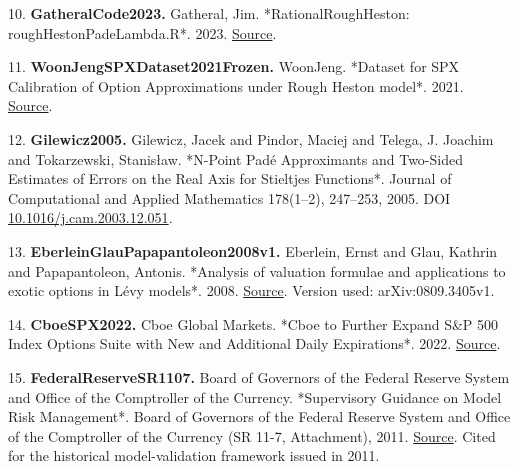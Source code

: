 \documentclass[a4paper,11pt]{article}
\begin{document}
10. \textbf{GatheralCode2023.} Gatheral, Jim. *RationalRoughHeston: roughHestonPadeLambda.R*. 2023. \href{https://github.com/jgatheral/RationalRoughHeston/blob/d65ea96e4c113fbb330074dfaea3e7715d650bbd/roughHestonPadeLambda.R}{Source}.

11. \textbf{WoonJengSPXDataset2021Frozen.} WoonJeng. *Dataset for SPX Calibration of Option Approximations under Rough Heston model*. 2021. \href{https://github.com/WoonJeng/Dataset-for-SPX-Calibration-of-Option-Approximations-under-Rough-Heston-model/tree/860049da2b7486fe8aa509061eff23cc28c2ef89}{Source}.

12. \textbf{Gilewicz2005.} Gilewicz, Jacek and Pindor, Maciej and Telega, J. Joachim and Tokarzewski, Stanisław. *N-Point Padé Approximants and Two-Sided Estimates of Errors on the Real Axis for Stieltjes Functions*. Journal of Computational and Applied Mathematics 178(1–2), 247–253, 2005. DOI \href{https://doi.org/10.1016/j.cam.2003.12.051}{10.1016/j.cam.2003.12.051}.

13. \textbf{EberleinGlauPapapantoleon2008v1.} Eberlein, Ernst and Glau, Kathrin and Papapantoleon, Antonis. *Analysis of valuation formulae and applications to exotic options in Lévy models*. 2008. \href{https://arxiv.org/abs/0809.3405v1}{Source}. Version used: arXiv:0809.3405v1.

14. \textbf{CboeSPX2022.} Cboe Global Markets. *Cboe to Further Expand S\&P 500 Index Options Suite with New and Additional Daily Expirations*. 2022. \href{https://ir.cboe.com/news/news-details/2022/Cboe-to-Further-Expand-SP-500-Index-Options-Suite-with-New-and-Additional-Daily-Expirations-09-19-2022/default.aspx}{Source}.

15. \textbf{FederalReserveSR1107.} Board of Governors of the Federal Reserve System and Office of the Comptroller of the Currency. *Supervisory Guidance on Model Risk Management*. Board of Governors of the Federal Reserve System and Office of the Comptroller of the Currency (SR 11-7, Attachment), 2011. \href{https://www.federalreserve.gov/boarddocs/srletters/2011/sr1107a1.pdf}{Source}. Cited for the historical model-validation framework issued in 2011.
\end{document}
